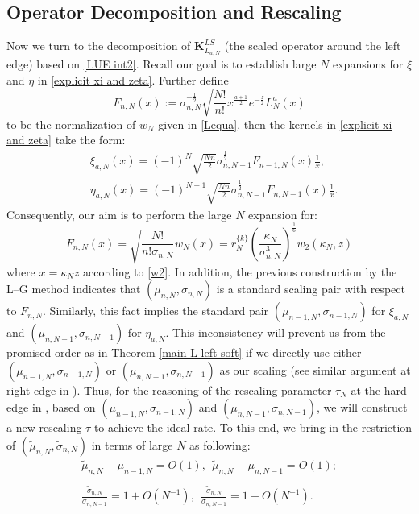\documentclass[11pt]{article}
\numberwithin{equation}{section}%
\numberwithin{theorem}{section}
\begin{document}
\subsection{Operator Decomposition and Rescaling}
Now we turn to the decomposition of $\mathbf{K}_{L_{a,N}}^{LS}$ (the scaled operator around the left edge) based on \eqref{LUE int2}. Recall our goal is to establish large $N$ expansions for $\xi$ and $\eta$ in \eqref{explicit xi and zeta}.
Further define
\begin{equation*}
    F_{n,N}(x):=\sigma_{n,N}^{-\frac{1}{2}}\sqrt{\frac{N!}{n!}}x^{\frac{a+1}{2}}e^{-\frac{z}{2}}L_N^{a}(x)
\end{equation*}
to be the normalization of $w_N$ given in \eqref{Lequa},
then the kernels in \eqref{explicit xi and zeta} take the form:
\begin{equation*}
\begin{split}
        &\xi_{a,N}(x)=(-1)^N\sqrt{\frac{Nn}{2}}\sigma_{n,N-1}^{\frac{1}{2}}F_{n-1,N}(x)\frac{1}{x},\\
        &\eta_{a,N}(x)=(-1)^{N-1}\sqrt{\frac{Nn}{2}}\sigma_{n,N-1}^{\frac{1}{2}}F_{n,N-1}(x)\frac{1}{x}.
\end{split}
\end{equation*} 
Consequently, our aim is to perform the large $N$ expansion for:
\begin{equation*}
    F_{n,N}(x)=\sqrt{\frac{N!}{n!\sigma_{n,N}}}w_N(x)=r^{\{k\}}_{N}\left(\frac{\kappa_N}{\sigma_{n,N}^3}\right)^\frac{1}{6}w_2(\kappa_N,z)
\end{equation*}
where $x=\kappa_Nz$ according to \eqref{w2}. In addition, the previous construction by the L--G method indicates that $(\mu_{n,N},\sigma_{n,N})$ is a standard scaling pair with respect to $F_{n,N}$. Similarly, this fact implies the standard pair $(\mu_{n-1,N},\sigma_{n-1,N})$ for $\xi_{a,N}$ and $(\mu_{n,N-1},\sigma_{n,N-1})$ for $\eta_{a,N}$. This inconsistency will prevent us from the promised order as in Theorem \ref{main L left soft} if we directly use either $(\mu_{n-1,N},\sigma_{n-1,N})$ or $(\mu_{n,N-1},\sigma_{n,N-1})$ as our scaling (see similar argument at right edge in \cite{el2006rate}). Thus, for the reasoning of the rescaling parameter $\tau_N$ at the hard edge in \cite{cai2025mesoscopicratesconvergencehermitian}, based on $(\mu_{n-1,N},\sigma_{n-1,N})$ and $(\mu_{n,N-1},\sigma_{n,N-1})$, we will construct a new rescaling $\tau$ to achieve the ideal rate. To this end, we bring in the restriction of $(\tilde\mu_{n,N},\tilde\sigma_{n,N})$ in terms of large $N$ as following:
\begin{equation}\label{restriction of recaling}
    \begin{array}{cc}
    \tilde{\mu}_{n,N}-\mu_{n-1,N}=O(1),~~\tilde\mu_{n,N}-\mu_{n,N-1}=O(1);\\
    \\
    \frac{\tilde{\sigma}_{n,N}}{\sigma_{n,N-1}}=1+O\left(N^{-1}\right),~~\frac{\tilde{\sigma}_{n,N}}{\sigma_{n,N-1}}=1+O\left(N^{-1}\right).
    \end{array}
\end{equation}
\end{document}
